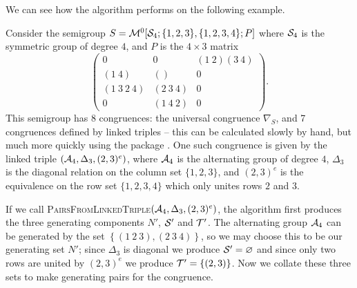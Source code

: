 We can see how the algorithm performs on the following example.

\begin{example}
  \label{ex:linked-triple-to-pairs-3x4}
  Consider the semigroup
  $S = \mathcal{M}^0[\mathcal{S}_4; \{1, 2, 3\}, \{1, 2, 3, 4\};P]$ where
  $\mathcal{S}_4$ is the symmetric group of degree $4$, and $P$ is the $4 \times 3$
  matrix
  $$
  \begin{pmatrix}
    0 & 0 & (1~2)(3~4) \\
    (1~4) & () & 0 \\
    (1~3~2~4) & (2~3~4) & 0 \\
    0 & (1~4~2) & 0
  \end{pmatrix}.
  $$
  This semigroup has 8 congruences: the universal congruence $\nabla_S$, and 7
  congruences defined by linked triples -- this can be calculated slowly by hand,
  but much more quickly using the \Semigroups{} package \cite{semigroups}.  One
  such congruence is given by the linked triple $\left(\mathcal{A}_4, \Delta_3, (2,3)^e\right)$,
  where $\mathcal{A}_4$ is the alternating group of degree $4$, $\Delta_3$ is the
  diagonal relation on the column set $\{1, 2, 3\}$, and $(2,3)^e$ is the
  equivalence on the row set $\{1, 2, 3, 4\}$ which only unites rows $2$ and
  $3$.

  If we call
  \textsc{PairsFromLinkedTriple}$\left(\mathcal{A}_4, \Delta_3,
    (2,3)^e\right)$,
  the algorithm first produces the three generating components $N'$, $\mathcal{S}'$ and
  $\mathcal{T}'$.  The alternating group $\mathcal{A}_4$ can be generated by the set
  $\left\{(1~2~3), (2~3~4)\right\}$, so we may choose this to be our generating
  set $N'$; since $\Delta_3$ is diagonal we produce $\mathcal{S}' = \varnothing$ and
  since only two rows are united by $(2,3)^e$ we produce
  $\mathcal{T}' = \left\{(2,3)\right\}$.  Now we collate these three sets to make
  generating pairs for the congruence.


\end{example}

